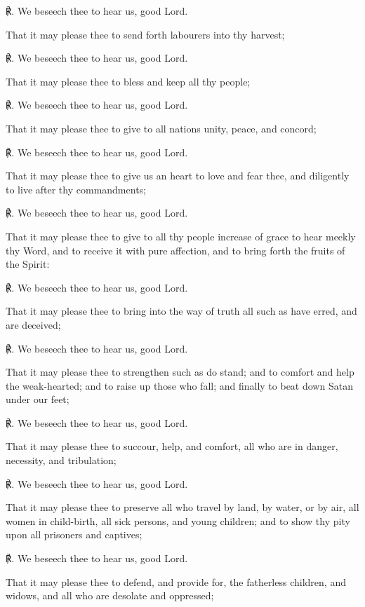 \begin{multicols}{2}
    ℟. We beseech thee to hear us, good Lord.
    \par\noindent
   That it may please thee to send forth labourers into thy harvest;
    
    ℟. We beseech thee to hear us, good Lord.
    \par\noindent
    That it may please thee to bless and keep all thy people;
    
    ℟. We beseech thee to hear us, good Lord.
    \par\noindent
    That it may please thee to give to all nations unity, peace, and concord;
    
    ℟. We beseech thee to hear us, good Lord.
    \par\noindent
    That it may please thee to give us an heart to love and fear thee, and diligently to live after thy commandments;
    
    ℟. We beseech thee to hear us, good Lord.
    \par\noindent
    That it may please thee to give to all thy people increase of grace to hear meekly thy Word, and to receive it with pure affection, and to bring forth the fruits of the Spirit:
    
    ℟. We beseech thee to hear us, good Lord.
    \par\noindent
    That it may please thee to bring into the way of truth all such as have erred, and are deceived;
    
    ℟. We beseech thee to hear us, good Lord.
    \par\noindent
    That it may please thee to strengthen such as do stand; and to comfort and help the weak-hearted; and to raise up those who fall; and finally to beat down Satan under our feet;
    
    ℟. We beseech thee to hear us, good Lord.
    \par\noindent
    That it may please thee to succour, help, and comfort, all who are in danger, necessity, and tribulation;
    
    ℟. We beseech thee to hear us, good Lord.
    \par\noindent
    That it may please thee to preserve all who travel by land, by water, or by air, all women in child-birth, all sick persons, and young children; and to show thy pity upon all prisoners and captives;
    
    ℟. We beseech thee to hear us, good Lord.
    \par\noindent
    That it may please thee to defend, and provide for, the fatherless children, and widows, and all who are desolate and oppressed;
    

\end{multicols}
